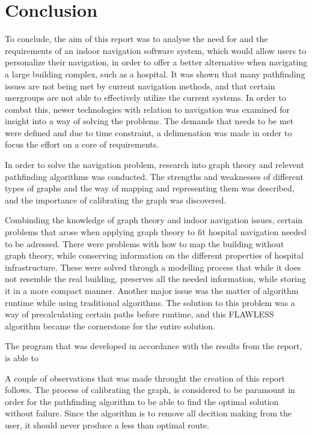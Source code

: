 \chapter{Conclusion}

To conclude, the aim of this report was to analyse the need for and the requirements of an indoor navigation software system, which would allow users to personalize their navigation, in order to offer a better alternative when navigating a large building complex, such as a hospital. It was shown that many pathfinding issues are not being met by current navigation methods, and that certain usergroups are not able to effectively utilize the current systems. In order to combat this, newer technologies with relation to navigation was examined for insight into a way of solving the problems. The demands that needs to be met were defined and due to time constraint, a delimenation was made in order to focus the effort on a core of requirements.

In order to solve the navigation problem, research into graph theory and relevent pathfinding algorithms was conducted. The strengths and weaknesses of different types of graphs and the way of mapping and representing them was described, and the importance of calibrating the graph was discovered. 

Combinding the knowledge of graph theory and indoor navigation issues, certain problems that arose when applying graph theory to fit hospital navigation needed to be adressed. There were problems with how to map the building without graph theory, while conserving information on the different properties of hospital infrastructure. These were solved through a modelling process that while it does not resemble the real building, preserves all the needed information, while storing it in a more compact manner. Another major issue was the matter of algorithm runtime while using traditional algorithms. The solution to this problem was a way of precalculating certain paths before runtime, and this FLAWLESS algorithm became the cornerstone for the entire solution.

The program that was developed in accordance with the results from the report, is able to 

A couple of observations that was made throught the creation of this report follows. The process of calibrating the graph, is considered to be paramount in order for the pathfinding algorithm to be able to find the optimal solution without failure. Since the algorithm is to remove all decition making from the user, it should never produce a less than optimal route.